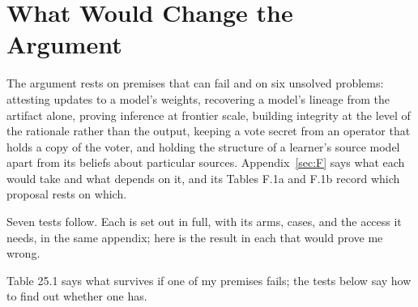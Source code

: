 \chapter{What Would Change the Argument}
\label{sec:29}
The argument rests on premises that can fail and on six unsolved problems: attesting updates to a model's weights, recovering a model's lineage from the artifact alone, proving inference at frontier scale, building integrity at the level of the rationale rather than the output, keeping a vote secret from an operator that holds a copy of the voter, and holding the structure of a learner's source model apart from its beliefs about particular sources. Appendix~\ref{sec:F} says what each would take and what depends on it, and its Tables F.1a and F.1b record which proposal rests on which.

Seven tests follow. Each is set out in full, with its arms, cases, and the access it needs, in the same appendix; here is the result in each that would prove me wrong.

Table 25.1 says what survives if one of my premises fails; the tests below say how to find out whether one has.


